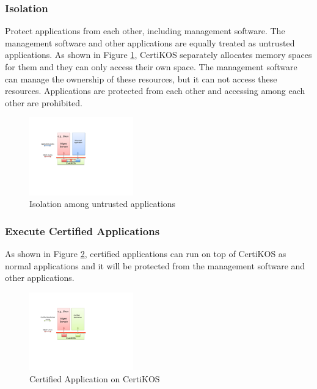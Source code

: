 \documentclass[a4paper,12pt]{article}
\begin{document}
\subsubsection{Isolation}

Protect applications from each other, including management software.  The management software and other applications are equally treated as untrusted applications. As shown in Figure \ref{fig:isolation}, CertiKOS separately allocates memory spaces for them  and they can only access their own space.  The management software can manage the ownership of these resources, but it can not access these resources.   Applications are protected from each other and accessing among each other are prohibited.
\begin{figure}[!ht]
 \centerline{
 \includegraphics[width=0.4\textwidth]{certikos_isolation}}
 \caption{Isolation among untrusted applications} \label{fig:isolation}
\end{figure}

\subsubsection{Execute Certified Applications}
As shown in Figure \ref{fig:certified_ap}, certified applications can run on top of CertiKOS as normal applications and it will be protected from the management software and other applications. 

\begin{figure}[!ht]
 \centerline{
 \includegraphics[width=0.4\textwidth]{certikos_certified_ap}}
 \caption{Certified Application on CertiKOS} \label{fig:certified_ap}
\end{figure}
\end{document}

